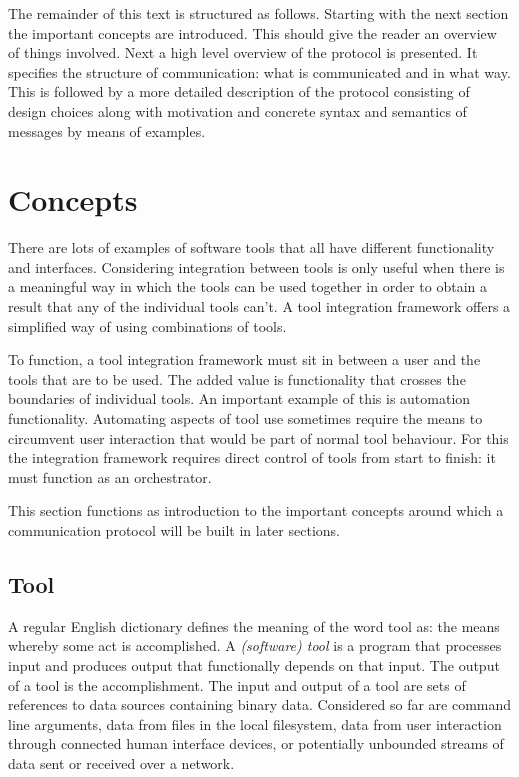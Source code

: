 \documentclass{article}
\begin{document}
  The remainder of this text is structured as follows. Starting with the next
  section the important concepts are introduced. This should give the reader an
  overview of things involved.  Next a high level overview of the protocol is
  presented. It specifies the structure of communication: what is communicated
  and in what way. This is followed by a more detailed description of the
  protocol consisting of design choices along with motivation and concrete
  syntax and semantics of messages by means of examples.


 \section{Concepts}

   There are lots of examples of software tools that all have different
   functionality and interfaces. Considering integration between tools is only
   useful when there is a meaningful way in which the tools can be used
   together in order to obtain a result that any of the individual tools can't.
   A tool integration framework offers a simplified way of using combinations
   of tools.
 
   To function, a tool integration framework must sit in between a user and the
   tools that are to be used. The added value is functionality that crosses the
   boundaries of individual tools. An important example of this is automation
   functionality. Automating aspects of tool use sometimes require the means to
   circumvent user interaction that would be part of normal tool behaviour.
   For this the integration framework requires direct control of tools from start to
   finish: it must function as an orchestrator.

   This section functions as introduction to the important concepts around
   which a communication protocol will be built in later sections.

  \subsection{Tool}

   A regular English dictionary defines the meaning of the word tool as: the
   means whereby some act is accomplished. A \textit{(software) tool} is a
   program that processes input and produces output that functionally depends
   on that input. The output of a tool is the accomplishment. The input
   and output of a tool are sets of references to data sources containing
   binary data. Considered so far are command line arguments, data from files
   in the local filesystem, data from user interaction through connected human
   interface devices, or potentially unbounded streams of data sent or received
   over a network.
   
\end{document}
